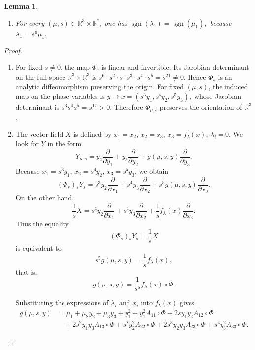 \documentclass[12pt]{article}
\newtheorem{lemma}[theorem]{Lemma}
\newtheorem{remark definition}{Remark Definition}[section]
\begin{document}
\begin{lemma}
\begin{enumerate}
\begin{enumerate}
			\item For every $(\mu,s)\in \mathbb{R}^3\times \mathbb{R}^{\ast}$,
			one has $\operatorname{sgn}(\lambda_1)=\operatorname{sgn}(\mu_1),$
			because $\lambda_1=s^6\mu_1.$
		\end{enumerate}
	\end{enumerate}
\end{lemma}

\begin{proof}
	\begin{enumerate}
		\item For fixed $s\neq 0$, the map $\Phi_s$ is linear and invertible.
		Its Jacobian determinant on the full space
		$\mathbb{R}^3\times \mathbb{R}^3$ is $s^6\cdot s^2\cdot s\cdot s^3\cdot s^4\cdot s^5=s^{21}\neq 0.$
		Hence $\Phi_s$ is an analytic diffeomorphism preserving the origin.		
		For fixed $(\mu,s)$, the induced map on the phase variables is $y\longmapsto x=(s^3y_1,s^4y_2,s^5y_3),$
		whose Jacobian determinant is $s^3s^4s^5=s^{12}>0.$
		Therefore $\Phi_{\mu,s}$ preserves the orientation of $\mathbb{R}^3$.
		
		\item The vector field $X$ is defined by $\dot{x}_1=x_2$,
		$\dot{x}_2=x_3$, $\dot{x}_3=f_\lambda(x)$, $\dot{\lambda}_i=0.$
		We look for $Y$ in the form
		$$
		Y_{\mu,s}
		=
		y_2\frac{\partial}{\partial y_1}
		+
		y_3\frac{\partial}{\partial y_2}
		+
		g(\mu,s,y)\frac{\partial}{\partial y_3}.
		$$
		Because $x_1=s^3y_1$, $x_2=s^4y_2$, $x_3=s^5y_3$,
		we obtain
		$$
		(\Phi_s)_*Y_s
		=
		s^3y_2\frac{\partial}{\partial x_1}
		+
		s^4y_3\frac{\partial}{\partial x_2}
		+
		s^5g(\mu,s,y)\frac{\partial}{\partial x_3}.
		$$
		On the other hand,
		$$
		\frac{1}{s}X
		=
		s^3y_2\frac{\partial}{\partial x_1}
		+
		s^4y_3\frac{\partial}{\partial x_2}
		+
		\frac{1}{s}f_\lambda(x)\frac{\partial}{\partial x_3}.
		$$
		Thus the equality
		$$
		(\Phi_s)_*Y_s=\frac{1}{s}X
		$$
		is equivalent to
		$$
		s^5g(\mu,s,y)=\frac{1}{s}f_\lambda(x),
		$$
		that is,
		$$
		g(\mu,s,y)=\frac{1}{s^6}f_\lambda(x)\circ\Phi.
		$$
		
		Substituting the expressions of $\lambda_i$ and $x_i$ into
		$f_\lambda(x)$ gives
		\begin{align*}
			g(\mu,s,y)
			&=
			\mu_1+\mu_2y_2+\mu_3y_3+y_1^2
			+
			y_1^2A_{11}\circ\Phi
			+
			2sy_1y_2A_{12}\circ\Phi
			\\
			&\quad
			+
			2s^2y_1y_3A_{13}\circ\Phi
			+
			s^2y_2^2A_{22}\circ\Phi
			+
			2s^3y_2y_3A_{23}\circ\Phi
			+
			s^4y_3^2A_{33}\circ\Phi.
		\end{align*}
		

\end{enumerate}
\end{proof}
\end{document}
